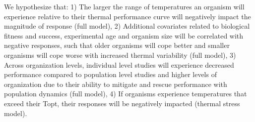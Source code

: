 \documentclass[12pt,twoside]{reedthesis}
\begin{document}
We hypothesize that: 1) The larger the range of temperatures an organism will experience relative to their thermal performance curve will negatively impact the magnitude of response (full model), 2) Additional covariates related to biological fitness and success, experimental age and organism size will be correlated with negative responses, such that older organisms will cope better and smaller organisms will cope worse with increased thermal variability (full model), 3) Across organization levels, individual level studies will experience decreased performance compared to population level studies and higher levels of organization due to their ability to mitigate and rescue performance with population dynamics (full model), 4) If organisms experience temperatures that exceed their Topt, their responses will be negatively impacted (thermal stress model).
\end{document}
